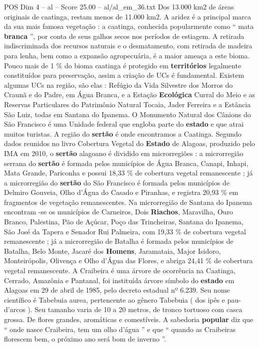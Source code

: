 \begin{textsample}{POS Dim 4 – al – Score 25.00 – al/al\_em\_36.txt}
Dos 13.000 km2 de áreas originais de caatinga, restam menos de 11.000 km2.
A aridez é a principal marca da sua mais famosa vegetação : a caatinga, conhecida popularmente como “ mata \textbf{branca} ”, por conta de seus galhos secos nos períodos de estiagem.
A retirada indiscriminada dos recursos naturais e o desmatamento, com retirada de madeira para lenha, bem como a expansão agropecuária, é a maior ameaça a este bioma.
Pouco mais de 1 \% do bioma caatinga é protegido em \textbf{territórios} legalmente constituídos para preservação, assim a criação de UCs é fundamental.
Existem algumas UCs na região, são elas : Refúgio da Vida Silvestre dos Morros do Craunã e do Padre, em Água Branca, e a Estação \textbf{Ecológica} Curral do Meio e as Reservas Particulares do Patrimônio Natural Tocaia, Jader Ferreira e a Estância São Luiz, todas em Santana do Ipanema.
O Monumento Natural dos Cânions do São Francisco é uma Unidade federal que engloba parte do \textbf{estado} e que atrai muitos turistas.
A região do \textbf{sertão} é onde encontramos a Caatinga.
Segundo dados reunidos no livro Cobertura Vegetal do \textbf{Estado} de Alagoas, produzido pelo IMA em 2010, o \textbf{sertão} alagoano é dividido em microrregiões : a microrregião serrana do \textbf{sertão} é formada pelos municípios de Água Branca, Canapi, Inhapi, Mata Grande, Pariconha e possui 18,33 \% de cobertura vegetal remanescente ; já a microrregião do \textbf{sertão} do São Francisco é formada pelos municípios de Delmiro Gouveia, Olho d’Água do Casado e Piranhas, e registra 20,93 \% em fragmentos de vegetação remanescentes.
Na microrregião de Santana do Ipanema encontram -se os municípios de Carneiros, Dois \textbf{Riachos}, Maravilha, Ouro Branco, Palestina, Pão de Açúcar, Poço das Trincheiras, Santana do Ipanema, São José da Tapera e Senador Rui Palmeira, com 19,33 \% de cobertura vegetal remanescente ; já a microrregião de Batalha é formada pelos municípios de Batalha, Belo Monte, Jacaré dos \textbf{Homens}, Jaramataia, Major Isidoro, Monteirópolis, Olivença e Olho d’Água das Flores, e abriga 24,41 \% de cobertura vegetal remanescente.
A Craibeira é uma árvore de ocorrência na Caatinga, Cerrado, Amazônia e Pantanal, foi instituída árvore símbolo do \textbf{estado} em Alagoas em 29 de abril de 1985, pelo decreto estadual nº 6.239.
Seu nome científico é Tabebuia aurea, pertencente ao gênero Tabebuia ( dos ipês e pau-d’arcos ).
Seu tamanho varia de 10 a 20 metros, de tronco tortuoso com casca grossa.
De flores grandes, aromáticas e comestíveis.
A sabedoria \textbf{popular} diz que “ onde nasce Craibeira, tem um olho d’água ” e que “ quando as Craibeiras florescem bem, o próximo ano será bom de inverno ”.

\end{textsample}
